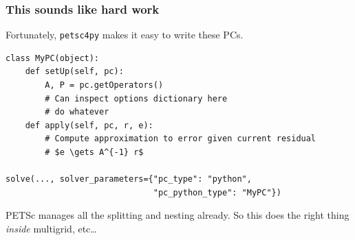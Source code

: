 \documentclass[presentation,aspectratio=43]{beamer}
\begin{document}
\begin{frame}[fragile]
  \frametitle{This sounds like hard work}
  Fortunately, \texttt{petsc4py} makes it easy to write these PCs.
\begin{verbatim}
class MyPC(object):
    def setUp(self, pc):
        A, P = pc.getOperators()
        # Can inspect options dictionary here
        # do whatever
    def apply(self, pc, r, e):
        # Compute approximation to error given current residual
        # $e \gets A^{-1} r$

solve(..., solver_parameters={"pc_type": "python",
                              "pc_python_type": "MyPC"})
\end{verbatim}
  PETSc manages all the splitting and nesting already.  So this does
  the right thing \emph{inside} multigrid, etc\ldots
\end{frame}

\end{document}
